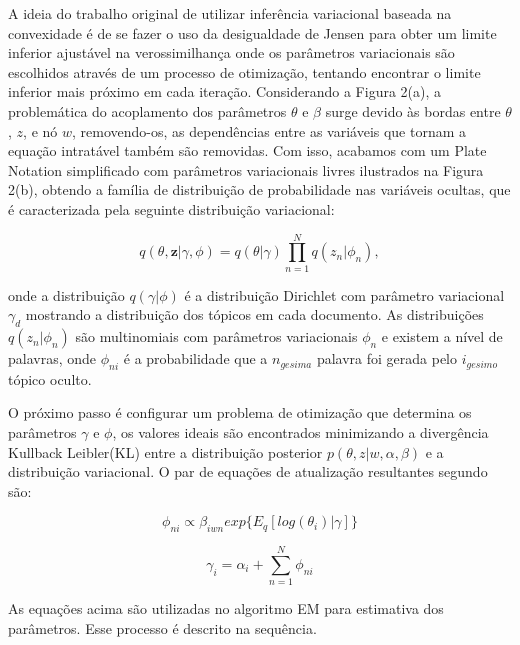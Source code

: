 \documentclass[12pt,a4paper]{article}
\begin{document}
  A ideia do trabalho original de utilizar inferência variacional baseada na convexidade é de se fazer o uso da desigualdade de Jensen para obter um limite inferior ajustável na verossimilhança \cite{jordan1999introduction} onde os parâmetros variacionais são escolhidos através de um processo de otimização,
   tentando encontrar o limite inferior mais próximo em cada iteração. Considerando a Figura 2(a), a problemática do acoplamento dos parâmetros $\theta$ e $\beta$ surge devido às bordas entre $\theta$, $z$,
   e nó $w$, removendo-os, as dependências entre as variáveis que tornam a equação intratável também são removidas. Com isso,
   acabamos com um Plate Notation simplificado com parâmetros variacionais livres ilustrados na Figura 2(b), obtendo a família de distribuição de probabilidade nas variáveis ocultas,
   que é caracterizada pela seguinte distribuição variacional:
  
  \begin{equation}
  q(\theta,\textbf{z}|\gamma,\phi)=q(\theta|\gamma)\prod_{n=1}^{N}q(z_n|\phi_n), 
  \end{equation}
  
  onde a distribuição  $q(\gamma|\phi)$ é a distribuição Dirichlet com parâmetro variacional $\gamma_d$ mostrando a distribuição dos tópicos em cada documento.
   As distribuições $q(z_n | \phi_n)$ são multinomiais com parâmetros variacionais $\phi_n$ e existem a nível de palavras, onde $\phi_{ni}$ é a probabilidade que a $n_{gesima}$ palavra foi gerada pelo $i_{gesimo}$ tópico oculto.
  
  O próximo passo é configurar um problema de otimização que determina os parâmetros $\gamma$ e $\phi$,
   os valores ideais são encontrados minimizando a divergência Kullback Leibler(KL) entre a distribuição posterior $p(\theta, z|w,\alpha,\beta)$ e a distribuição variacional.
   O par de equações de atualização resultantes segundo  são:
  
  \begin{equation}
  \phi_{ni} \propto \beta_{iwn} exp\{E_q[log(\theta_i)|\gamma]\}
  \end{equation}
  
  \begin{equation}
  \gamma_i = \alpha_i + \sum_{n=1}^{N} \phi_{ni}
  \end{equation}
  
  As equações acima são utilizadas no algoritmo EM para estimativa dos parâmetros. Esse processo é descrito na sequência.
  
\end{document}
